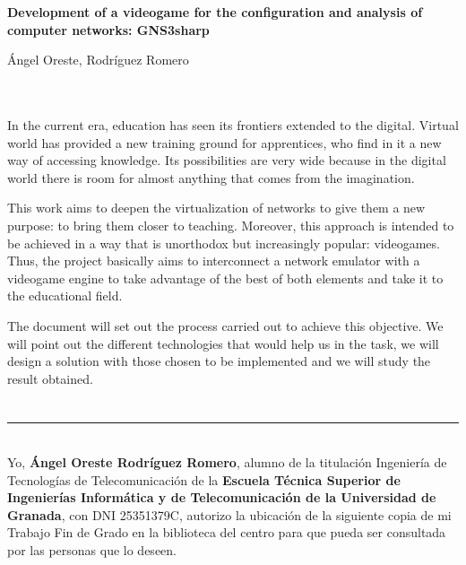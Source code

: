 \thispagestyle{empty}


\begin{center}
{\large\bfseries Development of a videogame for the configuration and analysis of computer networks: GNS3sharp}\\
\end{center}
\begin{center}
Ángel Oreste, Rodríguez Romero\\
\end{center}

\\

\vspace{0.7cm}
\\

In the current era, education has seen its frontiers extended to the digital. Virtual world has provided a new training ground for apprentices, who find in it a new way of accessing knowledge. Its possibilities are very wide because in the digital world there is room for almost anything that comes from the imagination.

This work aims to deepen the virtualization of networks to give them a new purpose: to bring them closer to teaching. Moreover, this approach is intended to be achieved in a way that is unorthodox but increasingly popular: videogames. Thus, the project basically aims to interconnect a network emulator with a videogame engine to take advantage of the best of both elements and take it to the educational field.

The document will set out the process carried out to achieve this objective. We will point out the different technologies that would help us in the task, we will design a solution with those chosen to be implemented and we will study the result obtained.

\chapter*{}
\thispagestyle{empty}

\noindent\rule[-1ex]{\textwidth}{2pt}\\[4.5ex]

Yo, \textbf{Ángel Oreste Rodríguez Romero}, alumno de la titulación Ingeniería de Tecnologías de Telecomunicación de la \textbf{Escuela Técnica Superior
de Ingenierías Informática y de Telecomunicación de la Universidad de Granada}, con DNI 25351379C, autorizo la
ubicación de la siguiente copia de mi Trabajo Fin de Grado en la biblioteca del centro para que pueda ser
consultada por las personas que lo deseen.


